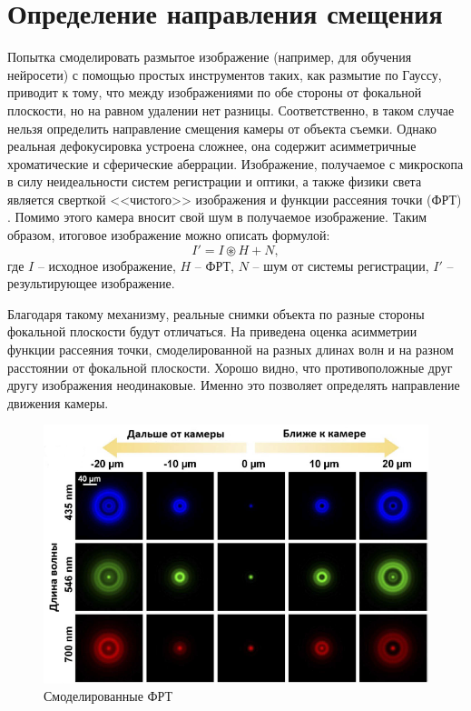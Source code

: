 \section{Определение направления смещения}
Попытка смоделировать размытое изображение (например, для обучения нейросети) с помощью простых инструментов таких, как размытие по Гауссу, приводит к тому, что между изображениями по обе стороны от фокальной плоскости, но на равном удалении нет разницы. Соответственно, в таком случае нельзя определить направление смещения камеры от объекта съемки. Однако реальная дефокусировка устроена сложнее, она содержит асимметричные хроматические и сферические аберрации. Изображение, получаемое с микроскопа в силу неидеальности систем регистрации и оптики, а также физики света является сверткой <<чистого>> изображения и функции рассеяния точки (ФРТ) \cite{sibarita2005deconvolution}. Помимо этого камера вносит свой шум в получаемое изображение. Таким образом, итоговое изображение можно описать формулой:
\begin{equation}
	I'=I \circledast H + N,
	\label{eq:res_img_with_PSF}
\end{equation}
где $I$ -- исходное изображение, $H$ -- ФРТ, $N$ -- шум от системы регистрации, $I'$ -- результирующее изображение.

Благодаря такому механизму, реальные снимки объекта по разные стороны фокальной плоскости будут отличаться. На  приведена оценка  асимметрии функции рассеяния точки, смоделированной на разных длинах волн и на разном расстоянии от фокальной плоскости. Хорошо видно, что противоположные друг другу изображения неодинаковые. Именно это позволяет определять направление движения камеры.

\begin{figure}[ht] 
	\center
	\includegraphics [scale=0.8] {my_folder/images/PSF.png}
	\caption{Смоделированные ФРТ}
	\label{fig:PSF}
\end{figure}


%
